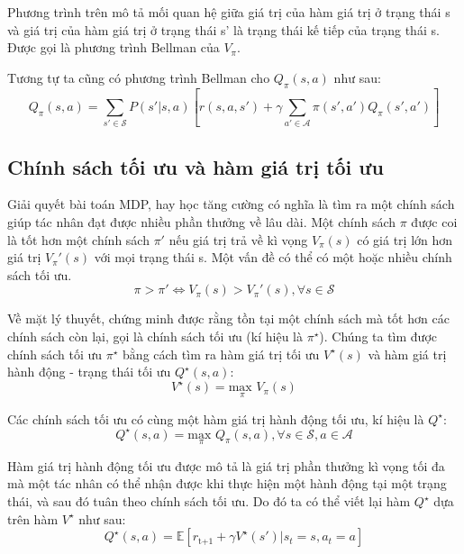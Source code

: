 \documentclass{uetgraduation}
\begin{document}
Phương trình trên mô tả mối quan hệ giữa giá trị của hàm giá trị ở trạng thái s và giá trị của hàm giá trị ở trạng thái s' là trạng thái kế tiếp của trạng thái s. Được gọi là phương trình Bellman
của $V_\pi$.

Tương tự ta cũng có phương trình Bellman cho $Q_\pi(s, a)$ như sau:
\begin{equation}
    Q_\pi(s, a) = \sum_{s' \in \mathcal{S}} P(s' | s, a) [r(s, a, s') + \gamma \sum_{a' \in \mathcal{A}} \pi(s', a') Q_\pi(s', a')]
\end{equation}

\subsection{Chính sách tối ưu và hàm giá trị tối ưu}
Giải quyết bài toán MDP, hay học tăng cường có nghĩa là tìm ra một chính sách giúp tác nhân đạt được nhiều phần thưởng về lâu dài. Một chính sách $\pi$ được coi là tốt hơn một chính sách $\pi'$ nếu giá
trị trả về kì vọng $V_\pi(s)$ có giá trị lớn hơn giá trị $V_\pi'(s)$ với mọi trạng thái s. Một vấn đề có thể có một hoặc nhiều chính sách tối ưu.
\begin{equation}
    \pi > \pi' \iff V_\pi(s) > V_\pi'(s), \forall s \in \mathcal{S}
\end{equation}

Về mặt lý thuyết, chứng minh được rằng tồn tại một chính sách mà tốt hơn các chính sách còn lại, gọi là chính sách tối ưu (kí hiệu là $\pi^\star$). Chúng ta tìm được chính sách tối ưu $\pi^\star$ bằng
cách tìm ra hàm giá trị tối ưu $V^\star(s)$ và hàm giá trị hành động - trạng thái tối ưu $Q^\star (s, a)$:
\begin{equation}
    V^\star (s) = \underset{\pi}{\text{max }} V_\pi(s)
\end{equation}

Các chính sách tối ưu có cùng một hàm giá trị hành động tối ưu, kí hiệu là $Q^\star$:
\begin{equation}
    Q^\star (s, a) = \underset{\pi}{\text{max }} Q_\pi(s, a), \forall s \in \mathcal{S}, a \in \mathcal{A}
\end{equation}

Hàm giá trị hành động tối ưu được mô tả là giá trị phần thưởng kì vọng tối đa mà một tác nhân có thể nhận được khi thực hiện một hành động tại một trạng thái, và sau đó tuân theo chính sách tối ưu. Do đó ta có
thể viết lại hàm $Q^\star$ dựa trên hàm $V^\star$ như sau:
\begin{equation}
    Q^\star (s, a) = \mathbb{E} [r_\text{t+1} + \gamma V^\star (s') | s_t = s, a_t = a]
\end{equation}
\end{document}
